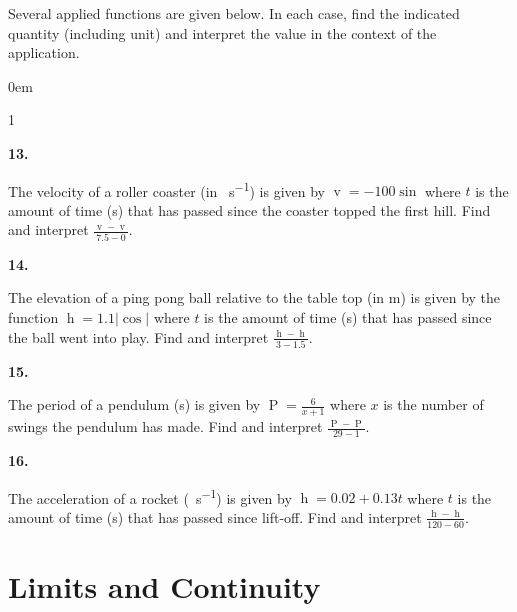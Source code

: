 \documentclass[12pt,]{book}
\theoremstyle{plain}
\theoremstyle{definition}
\numberwithin{equation}{section}
\newenvironment{exercisegroup}%
{\medskip\noindent}%
{\par\bigskip}%
\newlength{\exercisegroupindent}%
\newlength{\exercisegroupitemwidth}%
\newenvironment{exercisegrouplist}%
{\vspace{-\partopsep}%
\begin{adjustwidth}{\exercisegroupindent}{0em}}%
{\end{adjustwidth}%
\vspace{-\partopsep}%
\vspace{\baselineskip}}%
\newenvironment{exercisegroupbycol}[1]%
{\begin{exercisegrouplist}%
\vspace{-\multicolsep}%
\begin{multicols}{#1}%
\setlength{\parindent}{0em}%
\setlength{\exercisegroupitemwidth}{\linewidth}}%
{\end{multicols}%
\vspace{-\multicolsep}%
\end{exercisegrouplist}}%
\newenvironment{exercisegroupitem}[1]%
{\begin{minipage}[t]{\exercisegroupitemwidth}
\vspace{0pt}%
{\bfseries#1}%
\rule{0pt}{\baselineskip}}{\strut%
\end{minipage}%
\hspace{\columnsep}}%
\providecommand\phantomsection{}
\newcommand{\fe}[2]{\mathop{{#1}{\left(#2\right)}}}
\newcommand{\abs}[1]{\left|#1\right|}
\begin{document}
\begin{exercisegroup}%
Several applied functions are given below.  In each case, find the indicated quantity (including unit) and interpret the value in the context of the application.%
\par
\begin{exercisegroupbycol}{1}%
\begin{exercisegroupitem}{13. }\phantomsection\hypertarget{exercise-42}{\null}
The velocity of a roller coaster (in \si{\foot\per\second}) is given by \(\fe{v}{t}=-100\fe{\sin}{\frac{\pi t}{15}}\) where \(t\) is the amount of time (\si{\second}) that has passed since the coaster topped the first hill.  Find and interpret \(\frac{\fe{v}{7.5}-\fe{v}{0}}{7.5-0}\).%
\end{exercisegroupitem}%
\par%
\begin{exercisegroupitem}{14. }\phantomsection\hypertarget{exercise-43}{\null}
The elevation of a ping pong ball relative to the table top (in \si{\meter}) is given by the function \(\fe{h}{t}=1.1\abs{\fe{\cos}{\frac{2\pi t}{3}}}\) where \(t\) is the amount of time (\si{\second}) that has passed since the ball went into play.  Find and interpret \(\frac{\fe{h}{3}-\fe{h}{1.5}}{3-1.5}\).%
\end{exercisegroupitem}%
\par%
\begin{exercisegroupitem}{15. }\phantomsection\hypertarget{exercise-44}{\null}
The period of a pendulum (\si{\second}) is given by \(\fe{P}{x}=\frac{6}{x+1}\) where \(x\) is the number of swings the pendulum has made.  Find and interpret \(\frac{\fe{P}{29}-\fe{P}{1}}{29-1}\).%
\end{exercisegroupitem}%
\par%
\begin{exercisegroupitem}{16. }\phantomsection\hypertarget{exercise-45}{\null}
The acceleration of a rocket (\si{\mileperhour\per\second}) is given by \(\fe{h}{t}=0.02+0.13t\) where \(t\) is the amount of time (\si{\second}) that has passed since lift-off.  Find and interpret \(\frac{\fe{h}{120}-\fe{h}{60}}{120-60}\).%
\end{exercisegroupitem}%
\par%
\end{exercisegroupbycol}%
\end{exercisegroup}%
\typeout{************************************************}
\typeout{************************************************}
\chapter[Limits and Continuity]{Limits and Continuity}\label{chapter-limits}
\typeout{************************************************}
\typeout{************************************************}
\end{document}
